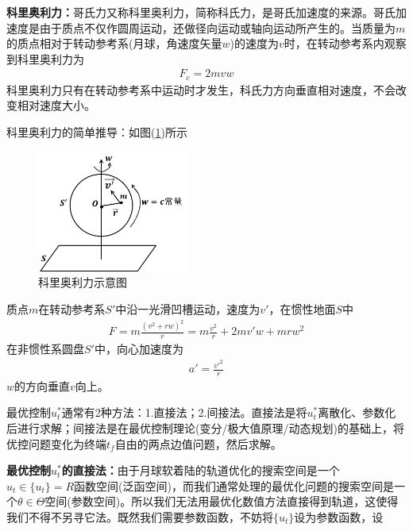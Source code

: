             \par
            \textbf{科里奥利力：}哥氏力又称科里奥利力，简称科氏力，是哥氏加速度的来源。哥氏加速度是由于质点不仅作圆周运动，还做径向运动或轴向运动所产生的。当质量为$m$的质点相对于转动参考系(月球，角速度矢量$w$)的速度为$v$时，在转动参考系内观察到科里奥利力为
            \begin{align*}
            F_c = 2mvw
            \end{align*}
            科里奥利力只有在转动参考系中运动时才发生，科氏力方向垂直相对速度，不会改变相对速度大小。
            \par
            科里奥利力的简单推导：如图(\ref{fig:科里奥利力示意图})所示
            \begin{figure}[H]
            \centering
            \includegraphics[height=4cm]{images/keliao.jpg}
            \caption{科里奥利力示意图}
            \label{fig:科里奥利力示意图}
            \end{figure}
            质点$m$在转动参考系$S'$中沿一光滑凹槽运动，速度为$v'$，在惯性地面$S$中
            \begin{align*}
            F = m\frac{(v^2+rw)^2}{r} = m\frac{v^2}{r}+2mv'w+mrw^2
            \end{align*}
            在非惯性系圆盘$S'$中，向心加速度为
            \begin{align*}
            a' = \frac{v'^2}{r}
            \end{align*}
            $w$的方向垂直$v$向上。
            \par
            最优控制$u_t^*$通常有2种方法：1.直接法；2.间接法。直接法是将$u_t^*$离散化、参数化后进行求解；间接法是在最优控制理论(变分/极大值原理/动态规划)的基础上，将优控问题变化为终端$t_f$自由的两点边值问题，然后求解。
            \par
            \textbf{最优控制$u_t^*$的直接法：}由于月球软着陆的轨道优化的搜索空间是一个$u_t\in \{u_t\} = R$函数空间(泛函空间)，而我们通常处理的最优化问题的搜索空间是一个$\theta\in \Theta$空间(参数空间)。所以我们无法用最优化数值方法直接得到轨道，这使得我们不得不另寻它法。既然我们需要参数函数，不妨将$\{u_t\}$设为参数函数，设
